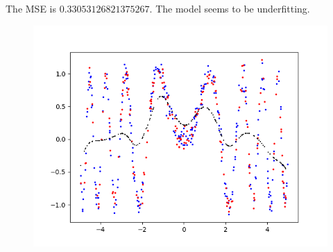 \begin{answer}
	The MSE is $0.33053126821375267$. The model seems to be underfitting.
	
	\begin{figure}[h]
		\centering
		\includegraphics[width=0.7\linewidth]{05-weighted/assets/plot}
		\caption{}
		\label{fig:plot}
	\end{figure}
	
\end{answer}